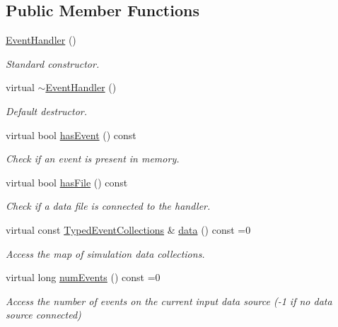 \subsection*{Public Member Functions}
\begin{DoxyCompactItemize}
\item 
\hyperlink{class_d_d4hep_1_1_event_handler_a83e36ed405cced9a1dab7414b2e0fe05}{Event\+Handler} ()
\begin{DoxyCompactList}\small\item\em Standard constructor. \end{DoxyCompactList}\item 
virtual \hyperlink{class_d_d4hep_1_1_event_handler_a3decb8cd88ba8af2b9b0b0f0f2fcd722}{$\sim$\+Event\+Handler} ()
\begin{DoxyCompactList}\small\item\em Default destructor. \end{DoxyCompactList}\item 
virtual bool \hyperlink{class_d_d4hep_1_1_event_handler_ad07cc15bff3dc3fc70cf37d2deefe3b7}{has\+Event} () const
\begin{DoxyCompactList}\small\item\em Check if an event is present in memory. \end{DoxyCompactList}\item 
virtual bool \hyperlink{class_d_d4hep_1_1_event_handler_a13bdcc68a401f6f2a9b855c4bc4beb11}{has\+File} () const
\begin{DoxyCompactList}\small\item\em Check if a data file is connected to the handler. \end{DoxyCompactList}\item 
virtual const \hyperlink{class_d_d4hep_1_1_event_handler_a4d441ff8a824b1e2f278e8b7a6391af3}{Typed\+Event\+Collections} \& \hyperlink{class_d_d4hep_1_1_event_handler_a263d136331d72994bcbf537d4aa16d4f}{data} () const =0
\begin{DoxyCompactList}\small\item\em Access the map of simulation data collections. \end{DoxyCompactList}\item 
virtual long \hyperlink{class_d_d4hep_1_1_event_handler_a005436bba029439b513645485e3c0ff5}{num\+Events} () const =0
\begin{DoxyCompactList}\small\item\em Access the number of events on the current input data source (-\/1 if no data source connected) \end{DoxyCompactList}\item 

\end{DoxyCompactItemize}
